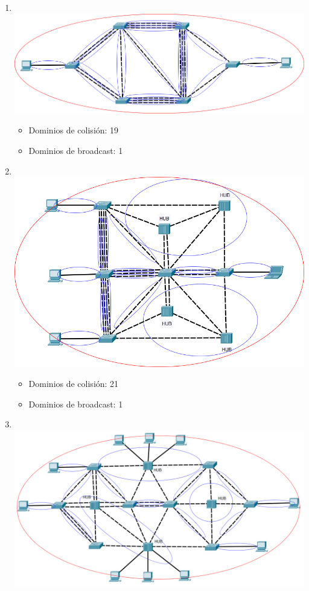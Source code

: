 \documentclass{article}
\begin{document}
\begin{enumerate}[label=\textbf{\arabic*.}]
    \item \textbf{}\\ \includegraphics[width=14.4cm]{top01-res}
    \begin{itemize}
        \item Dominios de colisión: 19
        \item Dominios de broadcast: 1
    \end{itemize}
    \item \textbf{}\\ \includegraphics[width=14.4cm]{top02-res}
    \begin{itemize}
        \item Dominios de colisión: 21
        \item Dominios de broadcast: 1
    \end{itemize}
    \item \textbf{}\\ \includegraphics[width=14.4cm]{top03-res}

\end{enumerate}
\end{document}

